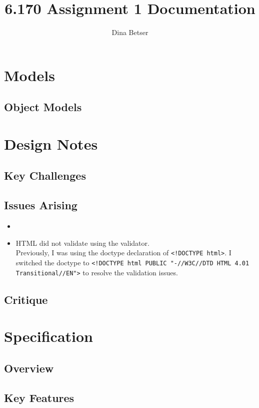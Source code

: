 \documentclass[11pt,letterpaper]{article}
\title{6.170 Assignment 1 Documentation}
\author{Dina Betser}
\begin{document}
\maketitle

\section{Models}
\subsection{Object Models}
\begin{center}
\end{center}

\section{Design Notes}

\subsection{Key Challenges}


\subsection{Issues Arising}
\begin{itemize}
\item 
\item HTML did not validate using the validator.\\
Previously, I was using the doctype declaration of \texttt{<!DOCTYPE html>}. I switched the doctype to \texttt{<!DOCTYPE html PUBLIC "-//W3C//DTD HTML 4.01 Transitional//EN">} to resolve the validation issues.
\end{itemize}

\subsection{Critique}

\section{Specification}
\subsection{Overview}
\subsection{Key Features}
\end{document}
